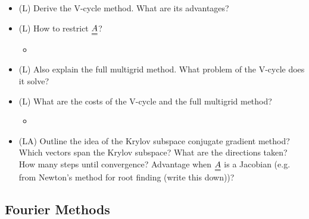\begin{itemize}
\begin{itemize}
{        but we want the high resolution of the fine grid, use multigrid-cycle}
    \end{itemize}
    \answerboxM
    \item (L) Derive the V-cycle method. What are its advantages?
    \answerboxL
    \item (L) How to restrict $\mat{A}$?
    \begin{itemize}
        \item {}
    \end{itemize}
    \answerboxM
    \item (L) Also explain the full multigrid method. What problem
    of the V-cycle does it solve?
    \answerboxM
    \item (L) What are the costs of the V-cycle and the full multigrid method?
    \begin{itemize}
        \item {}
    \end{itemize}
    \answerboxM
    \item (LA) Outline the idea of the Krylov subspace conjugate gradient method? Which vectors span the Krylov subspace?
    What are the directions taken? How many steps until convergence? Advantage when $\mat{A}$ is a Jacobian (e.g. from 
    Newton's method for root finding (write this down))?
    \answerboxL
\end{itemize}

\subsection*{Fourier Methods}

